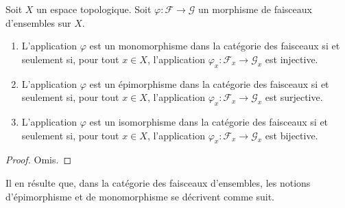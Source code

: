 \begin{lemma}
\label{lemma-points-exactness}
Soit $X$ un espace topologique. Soit $\varphi : \mathcal{F} \to \mathcal{G}$
un morphisme de faisceaux d'ensembles sur $X$.
\begin{enumerate}
\item L'application $\varphi$ est un monomorphisme dans la catégorie des
faisceaux si et seulement si, pour tout $x \in X$, l'application
$\varphi_x : \mathcal{F}_x \to \mathcal{G}_x$ est injective.
\item L'application $\varphi$ est un épimorphisme dans la catégorie des
faisceaux si et seulement si, pour tout $x \in X$, l'application
$\varphi_x : \mathcal{F}_x \to \mathcal{G}_x$ est surjective.
\item L'application $\varphi$ est un isomorphisme dans la catégorie des
faisceaux si et seulement si, pour tout $x \in X$, l'application
$\varphi_x : \mathcal{F}_x \to \mathcal{G}_x$ est bijective.
\end{enumerate}
\end{lemma}

\begin{proof}
Omis.
\end{proof}

\noindent
Il en résulte que, dans la catégorie des faisceaux d'ensembles, les notions
d'épimorphisme et de monomorphisme se décrivent comme suit.

